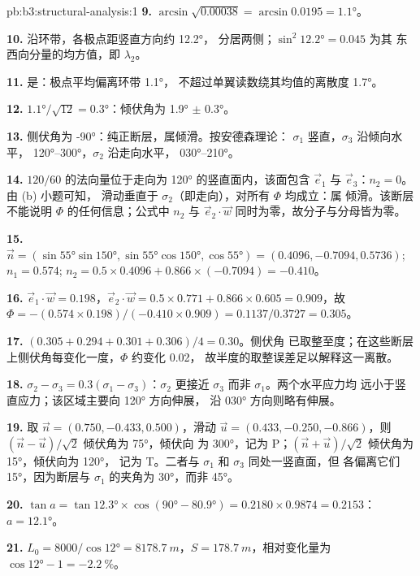 \begin{solution}{pb:b3:structural-analysis:1}
\textbf{9.} $\arcsin\sqrt{0.00038} = \arcsin0.0195 = \ang{1.1}$。

\textbf{10.} 沿环带，各极点距竖直方向约 \ang{12.2}，
分居两侧；$\sin^2\ang{12.2} = 0.045$ 为其
东西向分量的均方值，即 $\lambda_2$。

\textbf{11.} 是：极点平均偏离环带 \ang{1.1}，
不超过单翼读数绕其均值的离散度 \ang{1.7}。

\textbf{12.} $\ang{1.1}/\sqrt{12} = \ang{0.3}$：倾伏角为 \ang{1.9} $\pm$
\ang{0.3}。

\textbf{13.} 侧伏角为 \ang{-90}：纯正断层，属倾滑。按安德森理论：
$\sigma_1$ 竖直，$\sigma_3$ 沿倾向水平，
\ang{120}--\ang{300}，$\sigma_2$ 沿走向水平，
\ang{030}--\ang{210}。

\textbf{14.} $120/60$ 的法向量位于走向为
\ang{120} 的竖直面内，该面包含 $\vec e_1$ 与 $\vec e_3$：$n_2 = 0$。由 (b) 小题可知，
滑动垂直于 $\sigma_2$（即走向），对所有 $\Phi$ 均成立：属
倾滑。该断层不能说明 $\Phi$ 的任何信息；公式中 $n_2$ 与
$\vec e_2\cdot\vec w$ 同时为零，故分子与分母皆为零。

\textbf{15.} $\vec n = (\sin\ang{55}\sin\ang{150}, \sin\ang{55}\cos\ang{150},
\cos\ang{55}) = (0.4096, -0.7094, 0.5736)$; $n_1 = 0.574$; $n_2 = 0.5\times
0.4096 + 0.866\times(-0.7094) = -0.410$。

\textbf{16.} $\vec e_1\cdot\vec w = 0.198$，$\vec e_2\cdot\vec w = 0.5\times
0.771 + 0.866\times0.605 = 0.909$，故 $\Phi = -(0.574\times0.198)/(-0.410\times
0.909) = 0.1137/0.3727 = 0.305$。

\textbf{17.} $(0.305 + 0.294 + 0.301 + 0.306)/4 = 0.30$。侧伏角
已取整至度；在这些断层上侧伏角每变化一度，$\Phi$ 约变化 0.02，
故半度的取整误差足以解释这一离散。

\textbf{18.} $\sigma_2 - \sigma_3 = 0.3(\sigma_1 - \sigma_3)$：$\sigma_2$
更接近 $\sigma_3$ 而非 $\sigma_1$。两个水平应力均
远小于竖直应力；该区域主要向 \ang{120} 方向伸展，
沿 \ang{030} 方向则略有伸展。

\textbf{19.} 取 $\vec n = (0.750, -0.433, 0.500)$，滑动 $\vec u =
(0.433, -0.250, -0.866)$，则 $(\vec n - \vec u)/\sqrt2$ 倾伏角为 \ang{75}，倾伏向
为 \ang{300}，记为 P；$(\vec n + \vec u)/\sqrt2$ 倾伏角为 \ang{15}，倾伏向为 \ang{120}，
记为 T。二者与 $\sigma_1$ 和 $\sigma_3$ 同处一竖直面，但
各偏离它们 \ang{15}，因为断层与
$\sigma_1$ 的夹角为 \ang{30}，而非 \ang{45}。

\textbf{20.} $\tan a = \tan\ang{12.3}\times\cos(\ang{90} - \ang{80.9}) =
0.2180\times0.9874 = 0.2153$：$a = \ang{12.1}$。

\textbf{21.} $L_0 = 8000/\cos\ang{12} = \qty{8178.7}{m}$，$S =
\qty{178.7}{m}$，相对变化量为 $\cos\ang{12} - 1 =
\qty{-2.2}{\percent}$。


\end{solution}
